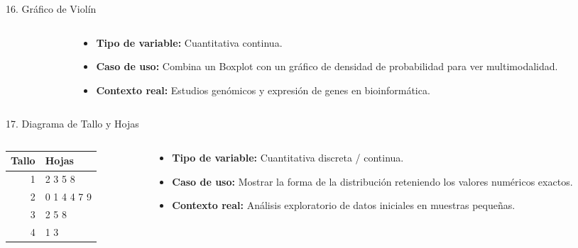 \documentclass[aspectratio=169,10pt]{beamer}
\begin{document}
\begin{frame}{16. Gráfico de Violín}
\begin{columns}
\begin{column}{0.55\textwidth}
\end{column}
\begin{column}{0.45\textwidth}
\begin{itemize}\small
\item \textbf{Tipo de variable:} Cuantitativa continua.
\item \textbf{Caso de uso:} Combina un Boxplot con un gráfico de densidad de probabilidad para ver multimodalidad.
\item \textbf{Contexto real:} Estudios genómicos y expresión de genes en bioinformática.
\end{itemize}
\end{column}
\end{columns}
\end{frame}

\begin{frame}{17. Diagrama de Tallo y Hojas}
\begin{columns}
\begin{column}{0.55\textwidth}
\begin{center}
\begin{tabular}{r|l}
\textbf{Tallo} & \textbf{Hojas} \\ \hline
1 & 2 3 5 8 \\
2 & 0 1 4 4 7 9 \\
3 & 2 5 8 \\
4 & 1 3
\end{tabular}
\end{center}
\end{column}
\begin{column}{0.45\textwidth}
\begin{itemize}\small
\item \textbf{Tipo de variable:} Cuantitativa discreta / continua.
\item \textbf{Caso de uso:} Mostrar la forma de la distribución reteniendo los valores numéricos exactos.
\item \textbf{Contexto real:} Análisis exploratorio de datos iniciales en muestras pequeñas.
\end{itemize}
\end{column}
\end{columns}
\end{frame}
\end{document}
